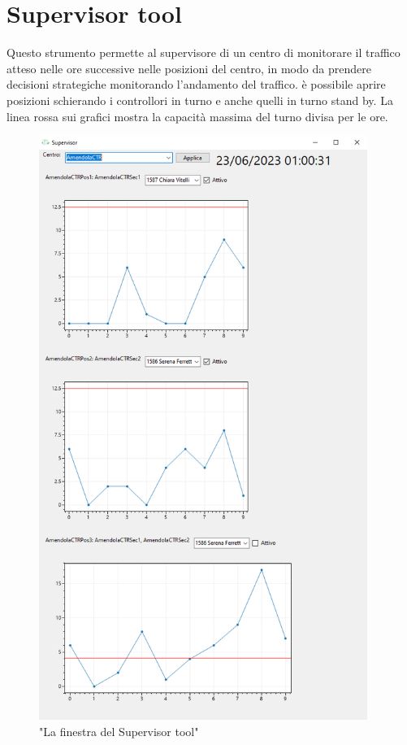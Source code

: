 \section{Supervisor tool}
Questo strumento permette al supervisore di un centro di monitorare il traffico atteso nelle ore successive nelle posizioni del centro, in modo da prendere decisioni strategiche monitorando l'andamento del traffico.
è possibile aprire posizioni schierando i controllori in turno e anche quelli in turno stand by. La linea rossa sui grafici mostra la capacità massima del turno divisa per le ore.
\begin{figure}[H]
     \centering
     \includegraphics[height=19cm]{figures/sup.PNG}
     \caption{"La finestra del Supervisor tool"}
   \end{figure}
